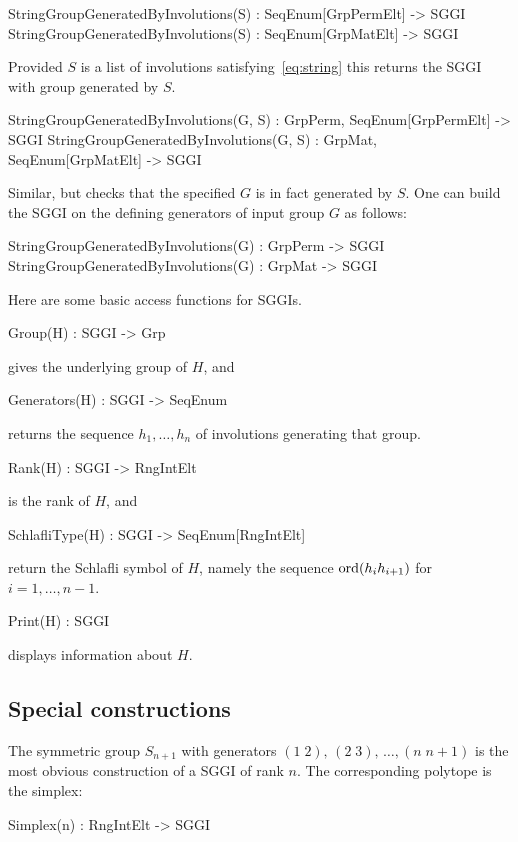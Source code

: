 \documentclass{documentation}
\begin{document}
\begin{intrinsics}
StringGroupGeneratedByInvolutions(S) : SeqEnum[GrpPermElt] -> SGGI
StringGroupGeneratedByInvolutions(S) : SeqEnum[GrpMatElt] -> SGGI
\end{intrinsics}
Provided $S$ is a list of involutions satisfying~\eqref{eq:string} this returns the SGGI with group generated by $S$.
\begin{intrinsics}
StringGroupGeneratedByInvolutions(G, S) : GrpPerm, SeqEnum[GrpPermElt] -> SGGI
StringGroupGeneratedByInvolutions(G, S) : GrpMat, SeqEnum[GrpMatElt] -> SGGI
\end{intrinsics}
Similar, but checks that the specified $G$ is in fact generated by $S$. One can build the SGGI on the defining generators 
of input group $G$ as follows:
\begin{intrinsics}
StringGroupGeneratedByInvolutions(G) : GrpPerm -> SGGI
StringGroupGeneratedByInvolutions(G) : GrpMat  -> SGGI
\end{intrinsics}
Here are some basic access functions for SGGIs.
\begin{intrinsics}
Group(H) : SGGI -> Grp
\end{intrinsics}
gives the underlying group of $H$, and
\begin{intrinsics}
Generators(H) : SGGI -> SeqEnum
\end{intrinsics}
returns the sequence $h_1,\ldots,h_n$ of involutions generating that group.
\begin{intrinsics}
Rank(H) : SGGI -> RngIntElt
\end{intrinsics}
is the rank of $H$, and
\begin{intrinsics}
SchlafliType(H) : SGGI -> SeqEnum[RngIntElt]
\end{intrinsics}
return the Schlafli symbol of $H$, namely the sequence ${\rm ord}(h_ih_{i+1})$ for $i=1,\ldots,n-1$.
\begin{intrinsics}
Print(H) : SGGI 
\end{intrinsics}
displays information about $H$.

\subsection{Special constructions}
\label{sec:special}
The symmetric group $S_{n+1}$ with generators $(1\;2),\,(2\;3),\,\ldots,(n\;n+1)$ is the most obvious 
construction of a SGGI of rank $n$. The corresponding polytope is the simplex:
\begin{intrinsics}
Simplex(n) : RngIntElt -> SGGI
\end{intrinsics}
\end{document}
